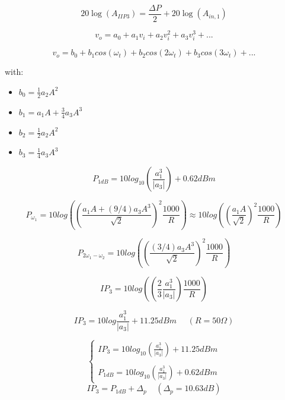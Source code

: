 \begin{equation}
	20\log(A_{IIP3}) = \frac{\Delta P}{2} + 20\log(A_{in,1})
\end{equation} 

\begin{equation}
	v_o=a_0+a_1v_i+a_2v_i^2+a_3v_i^3+...
\end{equation}

\begin{equation}
	v_o=b_0+b_1cos(\omega_t) +b_2cos(2\omega_t) +b_3cos(3\omega_t) +...
\end{equation}


with:

\begin{itemize}
	\item $b_0= \frac{1}{2}a_2A^2$

	\item $b_1= a_1A+\frac{3}{4}a_3A^3$

	\item $b_2= \frac{1}{2}a_2A^2$

	\item $b_3= \frac{1}{4}a_3A^3$
\end{itemize}
\begin{equation}
	P_{1dB}= 10log_{10}\left( \frac{a_1^3}{|a_3|} \right)+0.62dBm
\end{equation}

\begin{equation}
	P_{\omega_1}= 10log\left(\left( \frac{a_1A+(9/4)a_3A^3}{\sqrt{2}}\right)^2\frac{1000}{R}\right) \approx 10log\left(\left( \frac{a_1A}{\sqrt{2}}\right)^2\frac{1000}{R}\right)
\end{equation}

\begin{equation}
	P_{2\omega_1-\omega_2}= 10log\left(\left( \frac{(3/4)a_3A^3}{\sqrt{2}}\right)^2\frac{1000}{R}\right)
\end{equation}

\begin{equation}
	IP_3= 10log\left(\left( \frac{2}{3} \frac{a_1^3}{|a_3|}\right)\frac{1000}{R}\right)
\end{equation}

\begin{equation}
	IP_3 = 10log\frac{a_1^3}{|a_3|}+11.25dBm   \ \ \ \ \ \ (R= 50\Omega)
\end{equation}


\[
\begin{cases}
	IP_3 = 10log_{10}\left(\frac{a_1^3}{|a_3|}\right) + 11.25dBm\\
	\\
	P_{1dB}= 10log_{10}\left(\frac{a_1^3}{|a_3|}\right) +0.62dBm
\end{cases}
\]
\begin{equation}
	IP_3= P_{1dB} + \Delta_p \ \ \ \ \ (\Delta_p = 10.63dB)
\end{equation}

